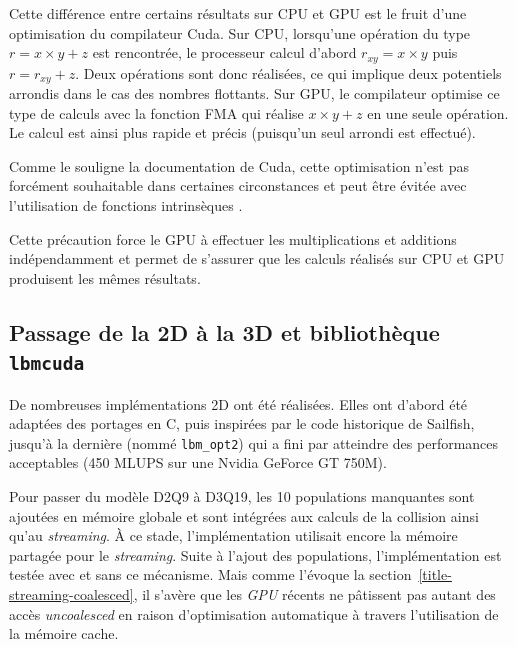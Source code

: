 Cette différence entre certains résultats sur \acs{CPU} et \acs{GPU} est le fruit d'une optimisation du compilateur Cuda. Sur \acs{CPU}, lorsqu'une opération du type $r = x \times y+z$ est rencontrée, le processeur calcul d'abord $r_{xy} = x \times y$ puis $r = r_{xy} + z$. Deux opérations sont donc réalisées, ce qui implique deux potentiels arrondis dans le cas des nombres flottants. Sur \acs{GPU}, le compilateur optimise ce type de calculs \cite{ZZZweb_cuda_2017-1} avec la fonction \ac{FMA} qui réalise $x \times y+z$ en une seule opération. Le calcul est ainsi plus rapide et précis (puisqu'un seul arrondi est effectué).

Comme le souligne la documentation de Cuda, cette optimisation n'est pas forcément souhaitable dans certaines circonstances et peut être évitée avec l'utilisation de fonctions intrinsèques \cite{ZZZweb_cuda_2017-1, ZZZweb_cuda_2017-2}.

Cette précaution force le \acs{GPU} à effectuer les multiplications et additions indépendamment et permet de s’assurer que les calculs réalisés sur \acs{CPU} et \acs{GPU} produisent les mêmes résultats.

\subsection{Passage de la 2D à la 3D et bibliothèque \texttt{lbmcuda}}
De nombreuses implémentations 2D ont été réalisées. Elles ont d’abord été adaptées des portages en C, puis inspirées par le code historique de Sailfish, jusqu’à la dernière (nommé \texttt{lbm\_opt2}) qui a fini par atteindre des performances acceptables (450 MLUPS sur une Nvidia GeForce GT 750M). 

Pour passer du modèle D2Q9 à D3Q19, les 10 populations manquantes sont ajoutées en mémoire globale et sont intégrées aux calculs de la collision ainsi qu'au \textit{streaming}. À ce stade, l'implémentation utilisait encore la mémoire partagée pour le \textit{streaming}. Suite à l'ajout des populations, l'implémentation est testée avec et sans ce mécanisme. Mais comme l'évoque la section~\ref{title-streaming-coalesced}, il s'avère que les \textit{GPU} récents ne pâtissent pas autant des accès \textit{uncoalesced} en raison d'optimisation automatique à travers l'utilisation de la mémoire cache.

